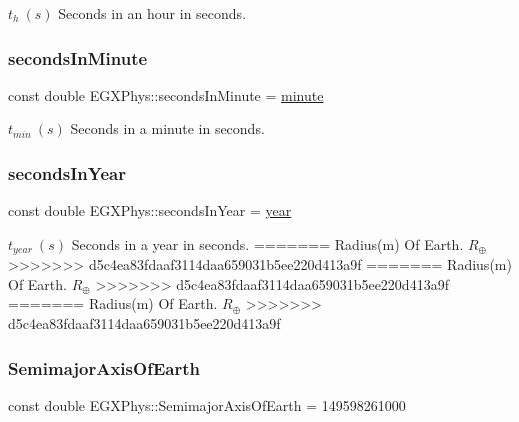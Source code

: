 $t_{h}\ (s)$ Seconds in an hour in seconds. \mbox{\label{namespace_e_g_x_phys_a65038e0b58235dc59a44cec16638df35}} 
\subsubsection{\texorpdfstring{seconds\+In\+Minute}{secondsInMinute}}
{\footnotesize\ttfamily const double E\+G\+X\+Phys\+::seconds\+In\+Minute = \hyperlink{namespace_e_g_x_phys_ab3a72a63e9c502847d0db88a167dc02b}{minute}}

$t_{min}\ (s)$ Seconds in a minute in seconds. \mbox{\label{namespace_e_g_x_phys_aac13efe8296819409bde4a0a8691d56a}} 
\subsubsection{\texorpdfstring{seconds\+In\+Year}{secondsInYear}}
{\footnotesize\ttfamily const double E\+G\+X\+Phys\+::seconds\+In\+Year = \hyperlink{namespace_e_g_x_phys_afee9eebc1da4a1db2198fe0c45bcb53f}{year}}

$t_{year}\ (s)$ Seconds in a year in seconds. \mbox{\label{namespace_e_g_x_phys_ad1bdca5cec4a0f4a4b8a18ead61de6d9}} 
=======
Radius(m) Of Earth. $R_\oplus$ \mbox{\label{namespace_e_g_x_phys_ad1bdca5cec4a0f4a4b8a18ead61de6d9}} 
>>>>>>> d5c4ea83fdaaf3114daa659031b5ee220d413a9f
=======
Radius(m) Of Earth. $R_\oplus$ \mbox{\label{namespace_e_g_x_phys_ad1bdca5cec4a0f4a4b8a18ead61de6d9}} 
>>>>>>> d5c4ea83fdaaf3114daa659031b5ee220d413a9f
=======
Radius(m) Of Earth. $R_\oplus$ \mbox{\label{namespace_e_g_x_phys_ad1bdca5cec4a0f4a4b8a18ead61de6d9}} 
>>>>>>> d5c4ea83fdaaf3114daa659031b5ee220d413a9f
\subsubsection{\texorpdfstring{Semimajor\+Axis\+Of\+Earth}{SemimajorAxisOfEarth}}
{\footnotesize\ttfamily const double E\+G\+X\+Phys\+::\+Semimajor\+Axis\+Of\+Earth = 149598261000}

